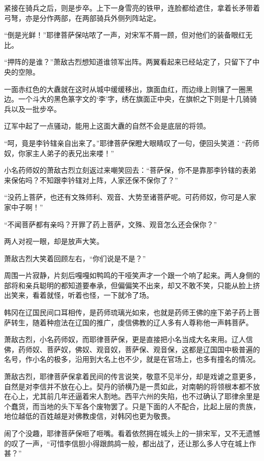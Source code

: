 紧接在骑兵之后，则是步卒。上下一身雪亮的铁甲，连脸都给遮住，拿着长矛带着弓弩，亦是分作两部，在两部骑兵外侧列阵站定。

“倒是光鲜！”耶律菩萨保咕哝了一声，对宋军不屑一顾，但对他们的装备眼红无比。

“押阵的是谁？”萧敌古烈想知道谁领军出阵。两翼看起来已经站定了，只留下了中央的空隙。

一面赤红色的大纛就在这时从城中缓缓移出，旗面血红，而边缘上则镶了一圈黑边。一个斗大的黑色篆字文的‘李’字，绣在旗面正中央，在旗帜之下则是十几骑骑兵以及一批步卒。

辽军中起了一点骚动，能用上这面大纛的自然不会是底层的将领。

“呵，竟是李钤辖亲自出来了。”耶律菩萨保瞪大眼睛叹了一句，便回头笑道：“药师奴，你家主人弟子的表兄出来喽！”

小名药师奴的萧敌古烈立刻返过来嘲笑回去：“菩萨保，你不是靠那李钤辖的表弟来保佑吗？不知跟李钤辖对上阵，人家还保不保你了？”

“没药上菩萨，也还有文殊师利、观音、大势至诸菩萨呢。可药师奴，你可是人家家中子啊！”

“不闻菩萨都有亲吗？开罪了药上菩萨，文殊、观音怎么还会保你？”

两人对视一眼，却是放声大笑。

萧敌古烈大笑着回顾左右，“你们说是不是？”

周围一片寂静，片刻后嘎嘎如鸭鸣的干哑笑声才一个跟一个响了起来。两人身侧的部将和亲兵聪明的都知道要奉承，但偏偏笑不出来，却又不敢不笑，只能从脸上挤出笑来，看着就怪，听着也怪，一下就冷了场。

韩冈在辽国民间口耳相传，是药师琉璃光如来，也就是药师王佛的座下弟子药上菩萨转生，随着种痘法在辽国的推广，虔信佛教的辽人多有人尊称他一声韩菩萨。

萧敌古烈，小名药师奴，而耶律菩萨保，更是直接把小名当成大名来用。辽人信佛，药师奴、菩萨奴，佛奴、观音奴，菩萨保、观音保，这都是辽国国中极普遍的名号，作小名的极多，沿用到大名上也不少，就是在官场上，也多有撞名的情况。

萧敌古烈，耶律菩萨保拿着民间的传言说笑，敬意不见半分，却是戏谑之意更多，自然是对李信并不放在心上。契丹的骄横乃是一贯如此，对南朝的将领根本都不放在心上，尤其前几年还逼着宋人割地。西平六州的失陷，也不过确认了耶律余里是个蠢货，而当地的头下军各个废物罢了。只是下面的人不配合，比起上层的贵族，地位越低的百姓越是对佛教虔信，对韩冈也更为敬畏。

闹了个没趣，耶律菩萨保咂了咂嘴。看着依然拥在城头上的一排宋军，又不无遗憾的叹了一声，“可惜李信胆小得跟鹧鸪一般，都出战了，还让那么多人守在城上作甚？”

